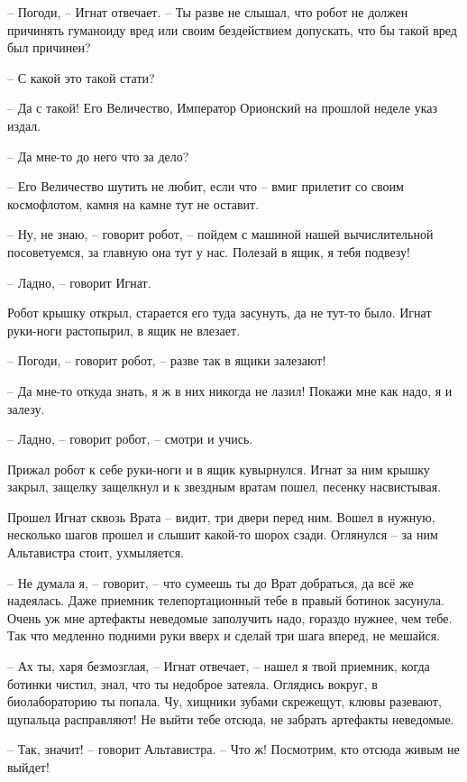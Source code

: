 \documentclass[ebook,oneside,final,openright]{memoir}
\begin{document}
– Погоди, – Игнат отвечает. – Ты разве не слышал, что робот не должен причинять гуманоиду вред или своим бездействием допускать, что бы такой вред был причинен?\par
– С какой это такой стати?\par
– Да с такой! Его Величество, Император Орионский на прошлой неделе указ издал.\par
– Да мне-то до него что за дело?\par
– Его Величество шутить не любит, если что – вмиг прилетит со своим космофлотом, камня на камне тут не оставит.\par
– Ну, не знаю, – говорит робот, – пойдем с машиной нашей вычислительной посоветуемся, за главную она тут у нас. Полезай в ящик, я тебя подвезу!\par
– Ладно, – говорит Игнат.\par
Робот крышку открыл, старается его туда засунуть, да не тут-то было. Игнат руки-ноги растопырил, в ящик не влезает. \par
– Погоди, – говорит робот, – разве так в ящики залезают! \par
– Да мне-то откуда знать, я ж в них никогда не лазил! Покажи мне как надо, я и залезу. \par
– Ладно, – говорит робот, – смотри и учись. \par
Прижал робот к себе руки-ноги и в ящик кувырнулся. Игнат за ним крышку закрыл, защелку защелкнул и к звездным вратам пошел, песенку насвистывая.\par
\par
Прошел Игнат сквозь Врата – видит, три двери перед ним. Вошел в нужную, несколько шагов прошел и слышит какой-то шорох сзади. Оглянулся – за ним Альтавистра стоит, ухмыляется. \par
\par
– Не думала я, – говорит, – что сумеешь ты до Врат добраться, да всё же надеялась. Даже приемник телепортационный тебе в правый ботинок засунула. Очень уж мне артефакты неведомые заполучить надо, гораздо нужнее, чем тебе. Так что медленно подними руки вверх и сделай три шага вперед, не мешайся.\par
– Ах ты, харя безмозглая, – Игнат отвечает, – нашел я твой приемник, когда ботинки чистил, знал, что ты недоброе затеяла. Оглядись вокруг, в биолабораторию ты попала. Чу, хищники зубами скрежещут, клювы разевают, щупальца расправляют! Не выйти тебе отсюда, не забрать артефакты неведомые.\par
– Так, значит! – говорит Альтавистра. – Что ж! Посмотрим, кто отсюда живым не выйдет!\par
\end{document}
